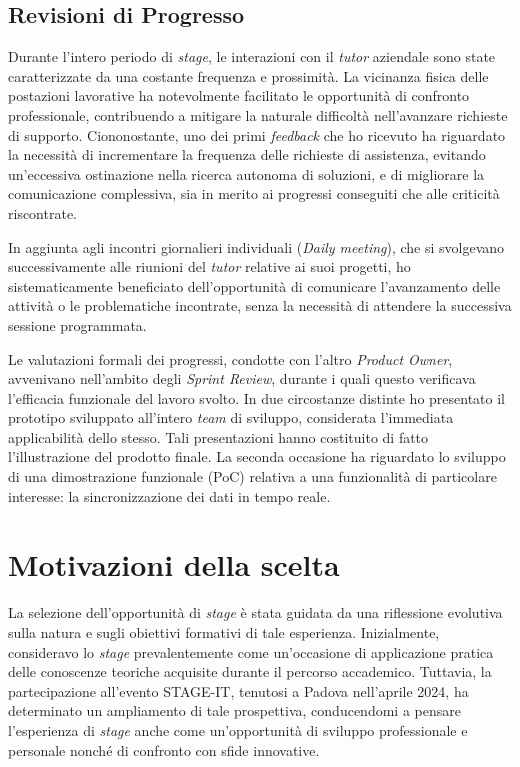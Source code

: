         \subsection{Revisioni di Progresso}

        Durante l'intero periodo di \textit{stage}, le interazioni con il \textit{tutor} aziendale sono state caratterizzate da una costante frequenza e prossimità. La vicinanza fisica delle postazioni lavorative ha notevolmente facilitato le opportunità di confronto professionale, contribuendo a mitigare la naturale difficoltà nell'avanzare richieste di supporto. Ciononostante, uno dei primi \textit{feedback} che ho ricevuto ha riguardato la necessità di incrementare la frequenza delle richieste di assistenza, evitando un'eccessiva ostinazione nella ricerca autonoma di soluzioni, e di migliorare la comunicazione complessiva, sia in merito ai progressi conseguiti che alle criticità riscontrate.

        \vspace{0.2 em}
        \noindent In aggiunta agli incontri giornalieri individuali (\textit{Daily meeting}), che si svolgevano successivamente alle riunioni del \textit{tutor} relative ai suoi progetti, ho sistematicamente beneficiato dell'opportunità di comunicare l'avanzamento delle attività o le problematiche incontrate, senza la necessità di attendere la successiva sessione programmata.

        \vspace{0.2 em}
        \noindent Le valutazioni formali dei progressi, condotte con l'altro \textit{Product Owner}, avvenivano nell'ambito degli \textit{Sprint Review}, durante i quali questo verificava l'efficacia funzionale del lavoro svolto. In due circostanze distinte ho presentato il prototipo sviluppato all'intero \textit{team} di sviluppo, considerata l'immediata applicabilità dello stesso. Tali presentazioni hanno costituito di fatto l'illustrazione del prodotto finale. La seconda occasione ha riguardato lo sviluppo di una dimostrazione funzionale (PoC) relativa a una funzionalità di particolare interesse: la sincronizzazione dei dati in tempo reale.
        
    \section{Motivazioni della scelta}
    La selezione dell'opportunità di \textit{stage} è stata guidata da una riflessione evolutiva sulla natura e sugli obiettivi formativi di tale esperienza. Inizialmente, consideravo lo \textit{stage} prevalentemente come un'occasione di applicazione pratica delle conoscenze teoriche acquisite durante il percorso accademico. Tuttavia, la partecipazione all'evento STAGE-IT, tenutosi a Padova nell'aprile 2024, ha determinato un ampliamento di tale prospettiva, conducendomi a pensare l'esperienza di \textit{stage} anche come un'opportunità di sviluppo professionale e personale nonché di confronto con sfide innovative.

